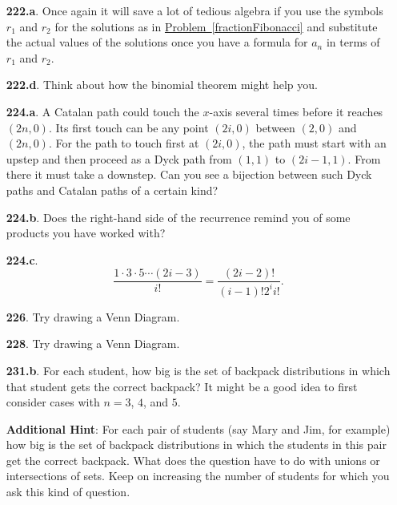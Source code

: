 \documentclass[10pt,]{book}
\theoremstyle{plain}
\theoremstyle{definition}
\theoremstyle{definition}
\numberwithin{equation}{chapter}
\begin{document}
\begin{itemize}[itemsep=1em]
\item[\textbf{222.a}.]Once again it will save a lot of tedious algebra if you use the symbols \(r_1\) and \(r_2\) for the solutions as in \hyperref[fractionFibonacci]{Problem~\ref{fractionFibonacci}} and substitute the actual values of the solutions once you have a formula for \(a_n\) in terms of \(r_1\) and \(r_2\).%

\item[\textbf{222.d}.]Think about how the binomial theorem might help you.%

\item[\textbf{224.a}.]A Catalan path could touch the \(x\)-axis several times before it reaches \((2n, 0)\).  Its first touch can be any point \((2i, 0)\) between \((2, 0)\) and \((2n, 0)\). For the path to touch first at \((2i, 0)\), the path must start with an upstep and then proceed as a Dyck path from \((1, 1)\) to \((2i - 1, 1)\). From there it must take a downstep. Can you see a bijection between such Dyck paths and Catalan paths of a certain kind?%

\item[\textbf{224.b}.]Does the right-hand side of the recurrence remind you of some products you have worked with?%

\item[\textbf{224.c}.]%
\begin{equation*}
\frac{1\cdot 3\cdot 5\cdots (2i-3)}{i!} = \frac{(2i-2)!}{(i-1)!2^i i!}\text{.}
\end{equation*}
%

\item[\textbf{226}.]Try drawing a Venn Diagram.%

\item[\textbf{228}.]Try drawing a Venn Diagram.%

\item[\textbf{231.b}.]For each student, how big is the set of backpack distributions in which that student gets the correct backpack?  It might be a good idea to first consider cases with \(n=3\), \(4\), and \(5\).%

\par\smallskip
\noindent\textbf{Additional Hint}: For each pair of students (say Mary and Jim, for example) how big is the set of backpack distributions in which the students in this pair get the correct backpack. What does the question have to do with unions or intersections of sets. Keep on increasing the number of students for which you ask this kind of question.%


\end{itemize}
\end{document}
